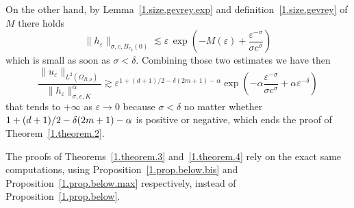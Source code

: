 \documentclass[AHL,Unicode,longabstracts,published]{cedram}
\theoremstyle{plain}
\newcommand*\e{\varepsilon}
\newcommand{\alf}{\alpha}%
\newcommand*\dsp{\displaystyle}
\begin{document}
On the other hand, by Lemma~\ref{1.size.gevrey.exp} and definition~\eqref{1.size.gevrey} of $M$ there holds
\[
\|h_{\e}\|_{\sigma,c,B_{r_0}(0)} \lesssim \e\,\exp\left(- M(\e) + \frac{\e^{-\sigma}}{\sigma c^{\sigma}}\right)
\]
which is small as soon as $\sigma < \delta$. Combining those two estimates we have then
\[
\frac{\dsp \|u_{\e}\|_{L^2(\Omega_{R,\rho})}}{\dsp \|h_{\e}\|^{\alf}_{\sigma,c,K}}
\gtrsim
\e^{1+(d+1)/2-\delta(2m+1)-\alf} \exp\left(-\alf \frac{\e^{-\sigma}}{\sigma c^{\sigma}} + \alf \e^{-\delta}\right)
\]
that tends to $+\infty$ as $\e\to0$ because $\sigma < \delta$ no matter whether $1+(d+1)/2\linebreak-\delta(2m+1)-\alf$ is positive or negative, which ends the proof of Theorem~\ref{1.theorem.2}.

The proofs of Theorems~\ref{1.theorem.3} and~\ref{1.theorem.4} rely on the exact same computations, using Proposition~\ref{1.prop.below.bis} and Proposition~\ref{1.prop.below.max} respectively, instead of Proposition~\ref{1.prop.below}.




\end{document}
